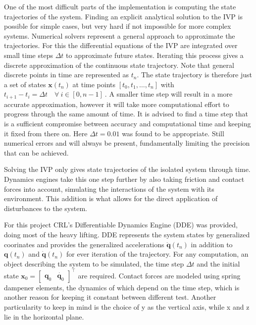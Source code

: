 One of the most difficult parts of the implementation is computing the state trajectories of the system. 
Finding an explicit analytical solution to the IVP is possible for simple cases, but very hard if not impossible for more complex systems. Numerical solvers represent a general approach to approximate the trajectories. For this the differential equations of the IVP are integrated over small time steps $\Delta t$ to approximate future states.
Iterating this process gives a discrete approximation of the continuous state trajectory. Note that general discrete points in time are represented as $t_n$.
The state trajectory is therefore just a set of states $\mathbf{x}(t_n)$ at time points $[t_0,t_1,\ldots, t_n]$ with $t_{i+1}-t_{i} = \Delta t\quad \forall\ i \in [0,n-1]\ $.
A smaller time step will result in a more accurate approximation, however it will take more computational effort to progress through the same amount of time.
It is advised to find a time step that is a sufficient compromise between accuracy and computational time and keeping it fixed from there on. Here $\Delta t = 0.01$ was found to be appropriate. 
Still numerical errors and will always be present, fundamentally limiting the precision that can be achieved. 

Solving the IVP only gives state trajectories of the isolated system through time.  Dynamics engines take this one step further by also taking friction and contact forces into account, simulating the interactions of the system with its environment. This addition is what allows for the direct application of disturbances to the system.

For this project CRL's Differentiable Dynamics Engine (DDE) was provided, doing most of the heavy lifting. %
DDE represents the system states by generalized coorinates and provides the generalized accelerations $\ddot{\mathbf{q}}(t_n)$ in addition to $\mathbf{q}(t_n)$ and $\dot{\mathbf{q}}(t_n)$ for ever iteration of the trajectory. For any computation, an object describing the system to be simulated, the time step $\Delta t$ and the initial state $\mathbf{x}_0 = \begin{bmatrix} \mathbf{q}_0&\dot{\mathbf{q}_0}\end{bmatrix}^\intercal$ are required. Contact forces are modeled using spring dampener elements, the dynamics of which depend on the time step, which is another reason for keeping it constant between different test. Another particularity to keep in mind is the choice of y as the vertical axis, while x and z lie in the horizontal plane. 


